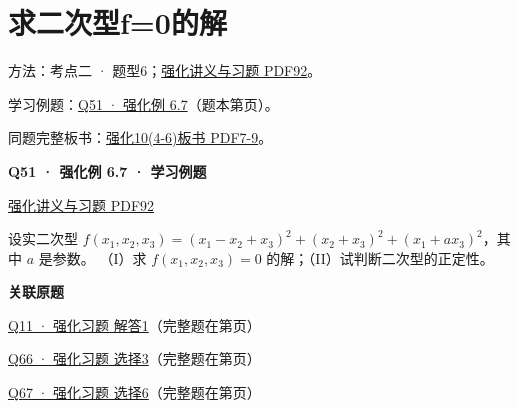 \documentclass[UTF8,fontset=fandol,11pt,a4paper]{ctexart}
\newcommand{\source}[1]{{\footnotesize\color{Muted}#1\par}}
\newcommand{\qtitle}[2]{\par\needspace{5\baselineskip}\hypertarget{#1}{}\label{#1}\textbf{#2}\par}
\begin{document}
\section*{求二次型f=0的解}
\hypertarget{node-C}{}
方法：考点二 · 题型6；\href{file:///Users/skyintelligence/Desktop/\%E5\%BE\%97\%E8\%AF\%BB\%E4\%B8\%AA\%E7\%A0\%94-\%E5\%8C\%97\%E5\%A4\%A7\%E8\%BD\%AF\%E5\%BE\%AE/\%E6\%95\%B0\%E5\%AD\%A6\%20150/Kira\%C2\%B727\%E7\%BA\%BF\%E6\%80\%A7\%E4\%BB\%A3\%E6\%95\%B0\%E5\%BC\%BA\%E5\%8C\%96\%E8\%AE\%B2\%E4\%B9\%89\%2B\%E4\%B9\%A0\%E9\%A2\%98.pdf\#page=92}{强化讲义与习题 PDF92}。\par
学习例题：\hyperlink{R-EX-07}{Q51 · 强化例 6.7}（题本第\pageref*{R-EX-07}页）。\par
同题完整板书：\href{file:///Users/skyintelligence/Desktop/\%E5\%BE\%97\%E8\%AF\%BB\%E4\%B8\%AA\%E7\%A0\%94-\%E5\%8C\%97\%E5\%A4\%A7\%E8\%BD\%AF\%E5\%BE\%AE/\%E6\%95\%B0\%E5\%AD\%A6\%20150/\%E7\%BA\%BF\%E6\%80\%A7\%E4\%BB\%A3\%E6\%95\%B0/\%E7\%BA\%BF\%E4\%BB\%A3\%E5\%BC\%BA\%E5\%8C\%9610\%284-6\%29\%20\%20\%E7\%AC\%AC\%E5\%85\%AD\%E7\%AB\%A0\%20\%E4\%BA\%8C\%E6\%AC\%A1\%E5\%9E\%8B2\%E3\%80\%90\%E4\%BE\%8B6.5\%E3\%80\%91-\%E3\%80\%90\%E4\%BE\%8B6.13\%E3\%80\%91.pdf\#page=7}{强化10(4-6)板书 PDF7-9}。\par
\vspace{3mm}
\begin{minipage}{\linewidth}
\qtitle{R-EX-07}{Q51 · 强化例 6.7 · 学习例题}
\source{\href{file:///Users/skyintelligence/Desktop/\%E5\%BE\%97\%E8\%AF\%BB\%E4\%B8\%AA\%E7\%A0\%94-\%E5\%8C\%97\%E5\%A4\%A7\%E8\%BD\%AF\%E5\%BE\%AE/\%E6\%95\%B0\%E5\%AD\%A6\%20150/Kira\%C2\%B727\%E7\%BA\%BF\%E6\%80\%A7\%E4\%BB\%A3\%E6\%95\%B0\%E5\%BC\%BA\%E5\%8C\%96\%E8\%AE\%B2\%E4\%B9\%89\%2B\%E4\%B9\%A0\%E9\%A2\%98.pdf\#page=92}{强化讲义与习题 PDF92}}
设实二次型 $f(x_1,x_2,x_3)=(x_1-x_2+x_3)^2+(x_2+x_3)^2+(x_1+ax_3)^2$，其中 $a$ 是参数。
（I）求 $f(x_1,x_2,x_3)=0$ 的解；（II）试判断二次型的正定性。
\end{minipage}\par\vspace{7mm}
\textbf{关联原题}\par
\hyperlink{R-LONG-01}{Q11 · 强化习题 解答1}（完整题在第\pageref*{R-LONG-01}页）\par
\hyperlink{R-MC-03}{Q66 · 强化习题 选择3}（完整题在第\pageref*{R-MC-03}页）\par
\hyperlink{R-MC-06}{Q67 · 强化习题 选择6}（完整题在第\pageref*{R-MC-06}页）\par
\clearpage
\end{document}

